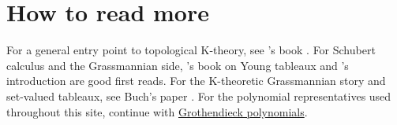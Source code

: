 \section[kTheoryHowToRead]{How to read more}

For a general entry point to topological K-theory, see 's
book \cite{Atiyah1967KTheory}.  For Schubert calculus and the Grassmannian
side, 's book on Young tableaux \cite{Fulton1997} and
's introduction \cite{Gillespie2019} are good first
reads.  For the K-theoretic Grassmannian story and set-valued tableaux, see
Buch's paper \cite{Buch2002}.  For the polynomial representatives used
throughout this site, continue with
\hyperref[grothendieck]{Grothendieck polynomials}.
